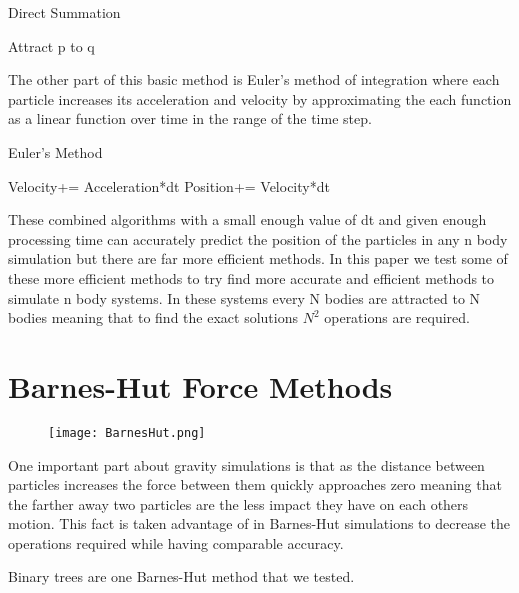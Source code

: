 \documentclass[11pt]{article}
\begin{document}
\begin{algorithm}
    \caption{Direct Summation} 
	\begin{algorithmic}[1]
				\State Attract p to q
			\EndFor
		\EndFor
	\end{algorithmic} 
\end{algorithm}
The other part of this basic method is Euler's method of integration where each particle increases its acceleration and velocity by approximating the each function as a linear function over time in the range of the time step.
\begin{algorithm}
    \caption{Euler's Method} 
	\begin{algorithmic}[1]
		    \State Velocity+= Acceleration*dt
		    \State Position+= Velocity*dt
        \EndFunction
	\end{algorithmic} 
\end{algorithm}
\vspace{5mm} %

These combined algorithms with a small enough value of dt and given enough processing time can accurately predict the position of the particles in any n body simulation but there are far more efficient methods. In this paper we test some of these more efficient methods to try find more accurate and efficient methods to simulate n body systems. In these systems  every N bodies are attracted to N bodies meaning that to find the exact solutions $N^2$ operations are required.
\section{Barnes-Hut Force Methods}



\begin{figure}[h]
\begin{center}
\texttt{[image: BarnesHut.png]}
\end{center}
\caption{
}
\label{setup}
\end{figure}
One important part about gravity simulations is that as the distance between particles increases the force between them quickly approaches zero meaning that the farther away two particles are the less impact they have on each others motion. This fact is taken advantage of in Barnes-Hut simulations to decrease the operations required while having comparable accuracy.

Binary trees are one Barnes-Hut method that we tested.
\end{document}
